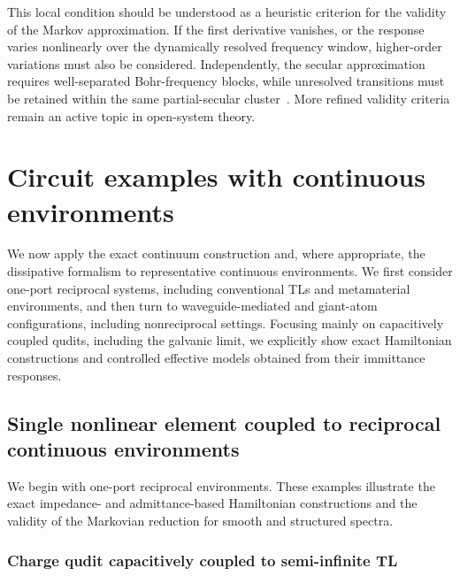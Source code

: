 \documentclass[prx,aps,twocolumn,article]{revtex4-2}
\begin{document}
This local condition should be understood as a heuristic criterion for the validity of the Markov approximation. If the first derivative vanishes, or the response varies nonlinearly over the dynamically resolved frequency window, higher-order variations must also be considered. Independently, the secular approximation requires well-separated Bohr-frequency blocks, while unresolved transitions must be retained within the same partial-secular
cluster~\cite{Schaller:2008,Cattaneo:2019,Trushechkin:2021}. More refined validity criteria remain an active topic in open-system theory.

\section{Circuit examples with
continuous environments}
\label{Sec:DissipativeExamples}

We now apply the exact continuum construction and, where appropriate, the dissipative formalism to representative continuous environments. We first consider one-port reciprocal systems, including conventional \gls{TLs} and metamaterial environments, and then turn to waveguide-mediated  and giant-atom configurations, including nonreciprocal settings. Focusing mainly on capacitively coupled qudits, including the galvanic limit, we explicitly show exact Hamiltonian constructions and controlled effective models obtained from their immittance responses.

\subsection{Single nonlinear element coupled to reciprocal continuous environments}

\label{Sec:ExamplesSingleQubits}

We begin with one-port reciprocal environments. These examples illustrate
the exact impedance- and admittance-based Hamiltonian constructions and the
validity of the Markovian reduction for smooth and structured spectra.


\subsubsection{Charge qudit capacitively coupled to semi-infinite \gls{TL}}
\label{Sec:SingleQubitSemiInfiniteTL}
\end{document}
